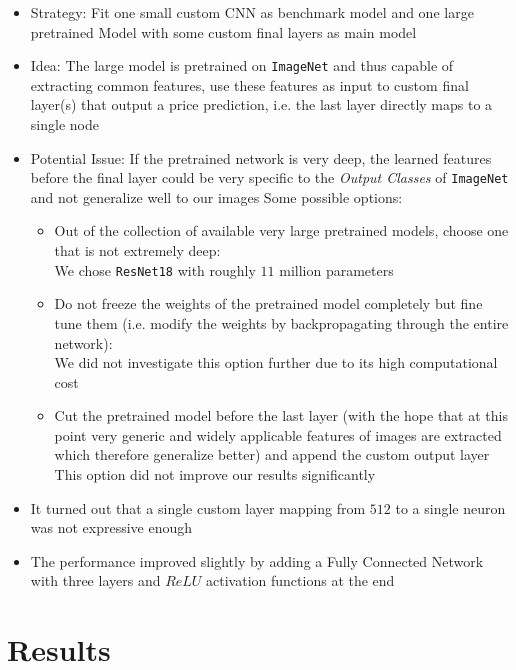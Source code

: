\documentclass[12pt, letterpaper]{article}
\begin{document}
\begin{itemize}
    \item Strategy: Fit one small custom CNN as benchmark model and one large pretrained Model with some custom final layers as main model
    \item Idea: The large model is pretrained on \texttt{ImageNet} and thus capable of extracting common features, use these features as input to custom final layer(s) that output a price prediction, i.e. the last layer directly maps to a single node
    \item Potential Issue: If the pretrained network is very deep, the learned features before the final layer could be very specific to the \emph{Output Classes} of \texttt{ImageNet} and not generalize well to our images
          Some possible options:
          \begin{itemize}
              \item Out of the collection of available very large pretrained models, choose one that is not extremely deep: \\
                    We chose \texttt{ResNet18} with roughly $11$ million parameters
              \item Do not freeze the weights of the pretrained model completely but fine tune them (i.e. modify the weights by backpropagating through the entire network): \\
                    We did not investigate this option further due to its high computational cost
              \item Cut the pretrained model before the last layer (with the hope that at this point very generic and widely applicable features of images are extracted which therefore generalize better) and append the custom output layer \\
                    This option did not improve our results significantly
          \end{itemize}
    \item It turned out that a single custom layer mapping from $512$ to a single neuron was not expressive enough
    \item The performance improved slightly by adding a Fully Connected Network with three layers and $ReLU$ activation functions at the end
\end{itemize}


\section{Results}
\end{document}
